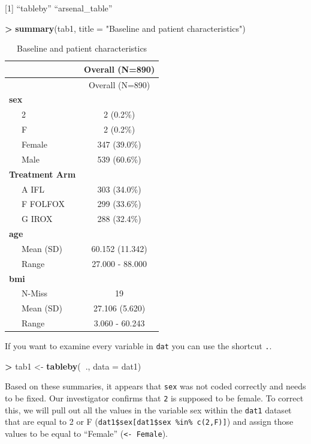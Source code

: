 \documentclass[
]{book}
\newenvironment{Shaded}{\begin{snugshade}}{\end{snugshade}}
\newcommand{\DataTypeTok}[1]{\textcolor[rgb]{0.13,0.29,0.53}{#1}}
\newcommand{\KeywordTok}[1]{\textcolor[rgb]{0.13,0.29,0.53}{\textbf{#1}}}
\newcommand{\NormalTok}[1]{#1}
\newcommand{\OperatorTok}[1]{\textcolor[rgb]{0.81,0.36,0.00}{\textbf{#1}}}
\newcommand{\StringTok}[1]{\textcolor[rgb]{0.31,0.60,0.02}{#1}}
\begin{document}
{[}1{]} ``tableby'' ``arsenal\_table''

\begin{Shaded}
\begin{Highlighting}[]
\OperatorTok{>}\StringTok{ }\KeywordTok{summary}\NormalTok{(tab1, }\DataTypeTok{title =} \StringTok{"Baseline and patient characteristics"}\NormalTok{)}
\end{Highlighting}
\end{Shaded}

\begin{longtable}[]{@{}lc@{}}
\caption{Baseline and patient characteristics}\tabularnewline
\toprule
& Overall (N=890)\tabularnewline
\midrule
\endfirsthead
\toprule
& Overall (N=890)\tabularnewline
\midrule
\endhead
\textbf{sex} &\tabularnewline
~~~2 & 2 (0.2\%)\tabularnewline
~~~F & 2 (0.2\%)\tabularnewline
~~~Female & 347 (39.0\%)\tabularnewline
~~~Male & 539 (60.6\%)\tabularnewline
\textbf{Treatment Arm} &\tabularnewline
~~~A IFL & 303 (34.0\%)\tabularnewline
~~~F FOLFOX & 299 (33.6\%)\tabularnewline
~~~G IROX & 288 (32.4\%)\tabularnewline
\textbf{age} &\tabularnewline
~~~Mean (SD) & 60.152 (11.342)\tabularnewline
~~~Range & 27.000 - 88.000\tabularnewline
\textbf{bmi} &\tabularnewline
~~~N-Miss & 19\tabularnewline
~~~Mean (SD) & 27.106 (5.620)\tabularnewline
~~~Range & 3.060 - 60.243\tabularnewline
\bottomrule
\end{longtable}

If you want to examine every variable in \texttt{dat} you can use the shortcut \texttt{.}.

\begin{Shaded}
\begin{Highlighting}[]
\OperatorTok{>}\StringTok{ }\NormalTok{tab1 <-}\StringTok{ }\KeywordTok{tableby}\NormalTok{(}\OperatorTok{~}\NormalTok{., }\DataTypeTok{data =}\NormalTok{ dat1)}
\end{Highlighting}
\end{Shaded}

Based on these summaries, it appears that \texttt{sex} was not coded correctly and needs to be fixed. Our investigator confirms that \texttt{2} is supposed to be female. To correct this, we will pull out all the values in the variable sex within the \texttt{dat1} dataset that are equal to 2 or F (\texttt{dat1\$sex{[}dat1\$sex\ \%in\%\ c(\textquotesingle{}2\textquotesingle{},\textquotesingle{}F\textquotesingle{}){]}}) and assign those values to be equal to ``Female'' (\texttt{\textless{}-\ \textquotesingle{}Female\textquotesingle{}}).
\end{document}
